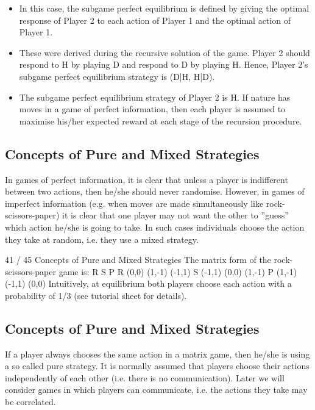\documentclass[]{report}
\begin{document}
\begin{itemize}
\item In this case, the subgame perfect equilibrium is defined by giving
the optimal response of Player 2 to each action of Player 1 and the
optimal action of Player 1.
\item These were derived during the recursive solution of the game.
Player 2 should respond to H by playing D and respond to D by
playing H. Hence, Player 2’s subgame perfect equilibrium strategy
is (D|H, H|D).
\item The subgame perfect equilibrium strategy of Player 2 is H.
If nature has moves in a game of perfect information, then each
player is assumed to maximise his/her expected reward at each
stage of the recursion procedure.

\end{itemize}

\subsection{Concepts of Pure and Mixed Strategies}
In games of perfect information, it is clear that unless a player is
indifferent between two actions, then he/she should never
randomise.
However, in games of imperfect information (e.g. when moves are
made simultaneously like rock-scissors-paper) it is clear that one
player may not want the other to ”guess” which action he/she is
going to take.
In such cases individuals choose the action they take at random,
i.e. they use a mixed strategy.

41 / 45
Concepts of Pure and Mixed Strategies
The matrix form of the rock-scissors-paper game is:
R S P
R (0,0) (1,-1) (-1,1)
S (-1,1) (0,0) (1,-1)
P (1,-1) (-1,1) (0,0)
Intuitively, at equilibrium both players choose each action with a
probability of 1/3 (see tutorial sheet for details).

\subsection{Concepts of Pure and Mixed Strategies}
If a player always chooses the same action in a matrix game, then
he/she is using a so called pure strategy.
It is normally assumed that players choose their actions
independently of each other (i.e. there is no communication).
Later we will consider games in which players can communicate,
i.e. the actions they take may be correlated.
\end{document}
